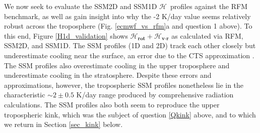 \documentclass{ametsoc}
\newcommand{\eqnref}[1]{(\ref{#1})}
\newcommand{\cminverse}{\ensuremath{\mathrm{cm^{-1}}}}
\newcommand{\wv}{\ensuremath{\widetilde{\nu}}}
\newcommand{\ch}{\ensuremath{\mathcal{H}}}
\newcommand{\tauk}{\ensuremath{\tau_{\wv}}}
\newcommand{\vr}{\ensuremath{\textbf{v-r}}}
\newcommand{\rot}{\ensuremath{\textbf{rot}}}
\begin{document}
  We now seek to evaluate  the SSM2D and SSM1D  \ch\ profiles against the RFM benchmark, as well as gain insight into why the -2 K/day value seems relatively robust across the troposphere (Fig. \ref{ecmwf_vs_rfm}a and question 1 above). To this end,  Figure \ref{H1d_validation} shows  $\ch_{\rot} + \ch_{\vr}$ as calculated via RFM, SSM2D, and SSM1D.  The SSM profiles (1D and 2D) track each other closely but  underestimate cooling near the surface, an error due to the CTS approximation \citep[][]{jeevanjee2019b}.  The SSM profiles also overestimate cooling in the upper troposphere and underestimate cooling in the stratosphere.
  Despite these errors and approximations, however, the  tropospheric SSM profiles nonetheless lie in the characteristic $\sim 2 \pm 0.5 $ K/day range produced by comprehensive radiation calculations. The SSM profiles also both seem to reproduce the upper tropospheric kink, which was the subject of question \ref{Qkink} above, and to which we return in  Section \ref{sec_kink} below.

 
\end{document}

